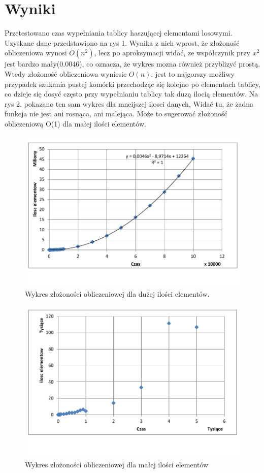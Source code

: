 \documentclass[twoside]{article}
\newcommand{\+}{\discretionary{\mbox{\scriptsize$\hookleftarrow$}}{}{}}
\begin{document}
\section{Wyniki}
Przetestowano czas wypełniania tablicy haszującej elementami losowymi. Uzyskane dane przedstawiono na rys 1. Wynika z nich wprost, że złożoność obliczeniowa wynosi $O(n^{2})$, lecz po aproksymacji widać, ze współczynik przy $x^{2}$ jest bardzo mały(0.0046), co oznacza, że wykres mozna również przyblizyć prostą. Wtedy złożoność obliczeniowa wyniesie $O(n)$. jest to najgorszy możliwy przypadek szukania pustej komórki przechodząc się kolejno po elementach tablicy, co dzieje się dosyć często przy wypełnianiu tablicy tak duzą ilocią elementów. Na rys 2. pokazano ten sam wykres dla mneijszej ilosci danych, Widać tu, że żadna funkcja nie jest ani rosnąca, ani malejąca. Może to sugerować złożoność obliczeniową O(1) dla małej ilości elementów.
\begin{figure}[h!]
\centering
\includegraphics[scale=0.75]{Wykres1.pdf}
\caption{Wykres złożoności obliczeniowej dla dużej ilości elementów.}
\label{fig:wykres1}
\end{figure}
\begin{figure}[h!]
	\centering
	\includegraphics[scale=0.75]{Wykres2.pdf}
	\caption{Wykres złożoności obliczeniowej dla małej ilości elementów}
	\label{fig:wykres2}
\end{figure}
\end{document}
